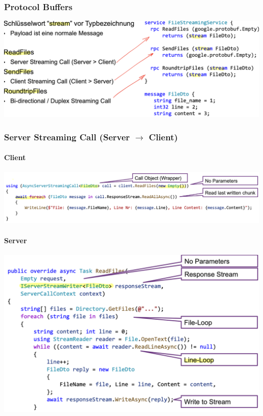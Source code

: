\subsubsection{Protocol Buffers}
\begin{center}
    \includegraphics[scale=.35]{graphic/gprc/Protocol Buffers.png}
\end{center}
\vspace{-8pt}

\subsubsection{Server Streaming Call (Server $\rightarrow$ Client)}
\paragraph{Client}
\begin{center}
    \includegraphics[scale=.33]{graphic/gprc/Server Streaming Call client.png}
\end{center}
\vspace{-8pt}
\paragraph{Server}
\begin{center}
    \includegraphics[scale=.4]{graphic/gprc/Server Streaming Call Service.png}
\end{center}
\vspace{-8pt}

